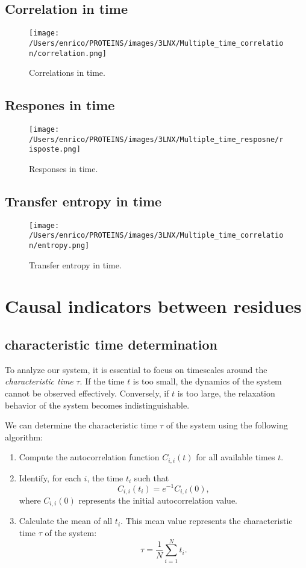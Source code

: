\documentclass[English, Lau, oneside]{sapthesis}
\begin{document}
\subsection*{Correlation in time}
\begin{figure}[h!]
    \centering
    \texttt{[image: /Users/enrico/PROTEINS/images/3LNX/Multiple\_time\_correlation/correlation.png]}    
    \caption{Correlations in time.}
\end{figure}
\subsection*{Respones in time}
\begin{figure}[h!]
    \centering
    \texttt{[image: /Users/enrico/PROTEINS/images/3LNX/Multiple\_time\_resposne/risposte.png]}    
    \caption{Responses in time.}
\end{figure}
\subsection*{Transfer entropy in time}
\begin{figure}[h!]
    \centering
    \texttt{[image: /Users/enrico/PROTEINS/images/3LNX/Multiple\_time\_correlation/entropy.png]}    
    \caption{Transfer entropy  in time.}
\end{figure}



\newpage
\section*{Causal indicators between residues}
\subsection*{characteristic time determination}
To analyze our system, it is essential to focus on timescales around the \textit{characteristic time} \(\tau\). 
If the time \(t\) is too small, the dynamics of the system cannot be observed effectively. Conversely, if \(t\) is too large, the relaxation behavior of the system becomes indistinguishable.

We can determine the characteristic time \(\tau\) of the system using the following algorithm:
\begin{enumerate}
    \item Compute the autocorrelation function \(C_{i,i}(t)\) for all available times \(t\).
    \item Identify, for each \(i\), the time \(t_i\) such that 
    \[
    C_{i,i}(t_i) = e^{-1} C_{i,i}(0),
    \]
    where \(C_{i,i}(0)\) represents the initial autocorrelation value.
    \item Calculate the mean of all \(t_i\). This mean value represents the characteristic time \(\tau\) of the system:
    \[
    \tau = \frac{1}{N} \sum_{i=1}^{N} t_i.
    \]
\end{enumerate}
\end{document}
